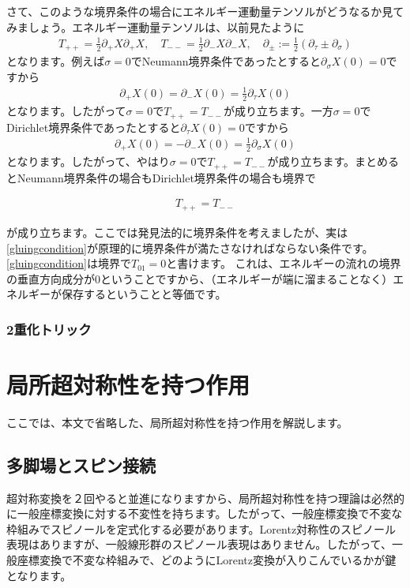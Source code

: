\documentclass[report,paper=a4, fontsize=12pt, line_length=16cm, number_of_lines=33,dvipdfmx]{jlreq}
\newenvironment{important}{\begin{tcolorbox}[
  colback = white,
  colframe = red!35,
  boxrule = 2mm,
  fonttitle = \bfseries,
  after = \noindent] }{\end{tcolorbox}}
\numberwithin{equation}{chapter}
\numberwithin{equation}{section}
\newcommand{\del}{\partial}
\begin{document}
さて、このような境界条件の場合にエネルギー運動量テンソルがどうなるか見てみましょう。エネルギー運動量テンソルは、以前見たように
\begin{align}
  T_{++}=\frac12 \del_{+}X\del_{+}X,\quad
  T_{--}=\frac12 \del_{-}X\del_{-}X,\quad
  \del_{\pm}:=\frac12 (\del_{\tau}\pm \del_{\sigma})
\end{align}
となります。例えば$\sigma=0$でNeumann境界条件であったとすると$\del_{\sigma}X(0)=0$ですから
\begin{align}
  \del_{+}X(0)=\del_{-}X(0)=\frac12 \del_{\tau}X(0)
\end{align}
となります。したがって$\sigma=0$で$T_{++}=T_{--}$が成り立ちます。一方$\sigma=0$でDirichlet境界条件であったとすると$\del_{\tau}X(0)=0$ですから
\begin{align}
  \del_{+}X(0)=-\del_{-}X(0)=\frac12 \del_{\sigma}X(0)
\end{align}
となります。したがって、やはり$\sigma=0$で$T_{++}=T_{--}$が成り立ちます。まとめるとNeumann境界条件の場合もDirichlet境界条件の場合も境界で
\begin{important}
  \begin{align}
    T_{++}=T_{--}\label{gluingcondition}
  \end{align}
\end{important}
が成り立ちます。ここでは発見法的に境界条件を考えましたが、実は\eqref{gluingcondition}が原理的に境界条件が満たさなければならない条件です。
\eqref{gluingcondition}は境界で$T_{01}=0$と書けます。
これは、エネルギーの流れの境界の垂直方向成分が$0$ということですから、（エネルギーが端に溜まることなく）エネルギーが保存するということと等価です。

\subsection{2重化トリック}


\appendix
\chapter{局所超対称性を持つ作用}
\label{app:localSUSY}
ここでは、本文で省略した、局所超対称性を持つ作用を解説します。

\section{多脚場とスピン接続}
超対称変換を２回やると並進になりますから、局所超対称性を持つ理論は必然的に一般座標変換に対する不変性を持ちます。したがって、一般座標変換で不変な枠組みでスピノールを定式化する必要があります。Lorentz対称性のスピノール表現はありますが、一般線形群のスピノール表現はありません。したがって、一般座標変換で不変な枠組みで、どのようにLorentz変換が入りこんでいるかが鍵となります。
\end{document}
